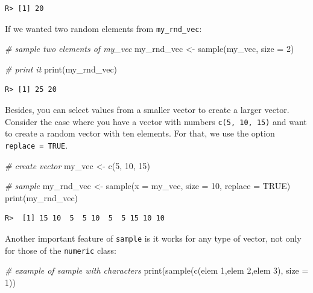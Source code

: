 \documentclass[
  12pt,
]{book}
\newenvironment{Shaded}{\begin{snugshade}}{\end{snugshade}}
\newcommand{\AttributeTok}[1]{\textcolor[rgb]{0.61,0.61,0.61}{#1}}
\newcommand{\CommentTok}[1]{\textcolor[rgb]{0.37,0.37,0.37}{\textit{#1}}}
\newcommand{\ConstantTok}[1]{\textcolor[rgb]{0,0,0}{#1}}
\newcommand{\DecValTok}[1]{\textcolor[rgb]{0.06,0.06,0.06}{#1}}
\newcommand{\FunctionTok}[1]{\textcolor[rgb]{0,0,0}{#1}}
\newcommand{\NormalTok}[1]{#1}
\newcommand{\OtherTok}[1]{\textcolor[rgb]{0.37,0.37,0.37}{#1}}
\newcommand{\StringTok}[1]{\textcolor[rgb]{0.5,0.5,0.5}{#1}}
\begin{document}
\begin{verbatim}
R> [1] 20
\end{verbatim}

If we wanted two random elements from \texttt{my\_rnd\_vec}:

\begin{Shaded}
\begin{Highlighting}[]
\CommentTok{\# sample two elements of my\_vec}
\NormalTok{my\_rnd\_vec }\OtherTok{\textless{}{-}} \FunctionTok{sample}\NormalTok{(my\_vec, }\AttributeTok{size =} \DecValTok{2}\NormalTok{)}

\CommentTok{\# print it}
\FunctionTok{print}\NormalTok{(my\_rnd\_vec)}
\end{Highlighting}
\end{Shaded}

\begin{verbatim}
R> [1] 25 20
\end{verbatim}

Besides, you can select values from a smaller vector to create a larger vector. Consider the case where you have a vector with numbers \texttt{c(5,\ 10,\ 15)} and want to create a random vector with ten elements. For that, we use the option \texttt{replace\ =\ TRUE}.

\begin{Shaded}
\begin{Highlighting}[]
\CommentTok{\# create vector}
\NormalTok{my\_vec }\OtherTok{\textless{}{-}} \FunctionTok{c}\NormalTok{(}\DecValTok{5}\NormalTok{, }\DecValTok{10}\NormalTok{, }\DecValTok{15}\NormalTok{)}

\CommentTok{\# sample}
\NormalTok{my\_rnd\_vec }\OtherTok{\textless{}{-}} \FunctionTok{sample}\NormalTok{(}\AttributeTok{x =}\NormalTok{ my\_vec, }\AttributeTok{size =} \DecValTok{10}\NormalTok{, }\AttributeTok{replace =} \ConstantTok{TRUE}\NormalTok{)}
\FunctionTok{print}\NormalTok{(my\_rnd\_vec)}
\end{Highlighting}
\end{Shaded}

\begin{verbatim}
R>  [1] 15 10  5  5 10  5  5 15 10 10
\end{verbatim}

Another important feature of \texttt{sample} is it works for any type of vector, not only for those of the \texttt{numeric} class:

\begin{Shaded}
\begin{Highlighting}[]
\CommentTok{\# example of sample with characters}
\FunctionTok{print}\NormalTok{(}\FunctionTok{sample}\NormalTok{(}\FunctionTok{c}\NormalTok{(}\StringTok{\textquotesingle{}elem 1\textquotesingle{}}\NormalTok{,}\StringTok{\textquotesingle{}elem 2\textquotesingle{}}\NormalTok{,}\StringTok{\textquotesingle{}elem 3\textquotesingle{}}\NormalTok{),}
             \AttributeTok{size =} \DecValTok{1}\NormalTok{))}
\end{Highlighting}
\end{Shaded}
\end{document}

